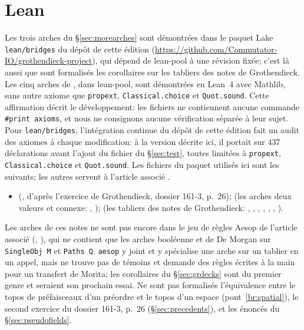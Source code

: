 \section{Lean}\label{sec:nlean}

Les trois arches du \S\ref{sec:morearches} sont démontrées dans le paquet Lake \texttt{lean/bridges} du dépôt de cette édition (\url{https://github.com/Commutator-IO/grothendieck-project}), qui dépend de lean-pool à une révision fixée; c'est là aussi que sont formalisés les corollaires sur les tabliers des notes de Grothendieck. Les cinq arches de \lp{}, dans lean-pool, sont démontrées en Lean~4 avec Mathlib, sans autre axiome que \texttt{propext}, \texttt{Classical.choice} et \texttt{Quot.sound}. Cette affirmation décrit le développement: les fichiers ne contiennent aucune commande \texttt{\#print axioms}, et nous ne consignons aucune vérification séparée à leur sujet. Pour \texttt{lean/bridges}, l'intégration continue du dépôt de cette édition fait un audit des axiomes à chaque modification: à la version décrite ici, il portait sur 437 déclarations avant l'ajout du fichier  du \S\ref{sec:test}, toutes limitées à \texttt{propext}, \texttt{Classical.choice} et \texttt{Quot.sound}. Les fichiers du paquet utilisés ici sont les suivants; les autres servent à l'article associé \cite{bridges-generator}.
\begin{itemize}
\item {} (, d'après l'exercice de Grothendieck, dossier 161-3, p.~26);  (les arches deux valeurs et connexe: , );  (les tabliers des notes de Grothendieck: , , , , , , ).
\end{itemize}
Les arches de ces notes ne sont pas encore dans le jeu de règles Aesop de l'article associé (, \cite[\S\,Limites]{bridges-generator}), qui ne contient que les arches booléenne et de De Morgan sur \texttt{SingleObj M} et \texttt{Paths Q}. \texttt{aesop} y joint et y spécialise une arche sur un tablier en un appel, mais ne trouve pas de témoins et demande des règles écrites à la main pour un transfert de Morita; les corollaires du \S\ref{sec:grdecks} sont du premier genre et seraient son prochain essai.
Ne sont pas formalisés l'équivalence entre le topos de préfaisceaux d'un préordre et le topos d'un espace (pont~\ref{br:spatial}), le second exercice du dossier 161-3, p.~26 (\S\ref{sec:precedents}), et les énoncés du \S\ref{sec:pseudofields}.

